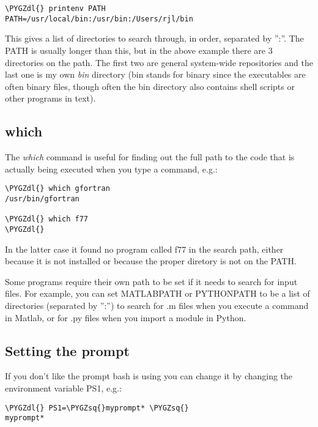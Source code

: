 \documentclass[letterpaper,10pt,english]{sphinxmanual}
\def\PYGZdl{\char`\$}
\def\PYGZsq{\char`\'}
\renewcommand\PYGZsq{\textquotesingle}
\begin{document}
\begin{Verbatim}[commandchars=\\\{\}]
\PYGZdl{} printenv PATH
PATH=/usr/local/bin:/usr/bin:/Users/rjl/bin
\end{Verbatim}

This gives a list of directories to search through, in order, separated by
'':''.   The PATH is usually longer than this, but in the above example there
are 3 directories on the path.  The first two are general system-wide
repositories and the last one is my own \emph{bin} directory (bin stands for
binary since the executables are often binary files, though often the bin
directory also contains shell scripts or other programs in text).


\subsection{which}
\label{unix:id6}\label{unix:which}
The \emph{which} command is useful for finding out the full path to the code that
is actually being executed when you type a command, e.g.:

\begin{Verbatim}[commandchars=\\\{\}]
\PYGZdl{} which gfortran
/usr/bin/gfortran

\PYGZdl{} which f77
\PYGZdl{}
\end{Verbatim}

In the latter case it found no program called f77 in the search path, either
because it is not installed or because the proper diretory is not on the
PATH.

Some programs require their own path to be set if it needs to search for
input files.  For example, you can set MATLABPATH or PYTHONPATH
to be a list of directories (separated by '':'') to search for .m files
when you execute a command in Matlab, or for .py files when you import
a module in Python.


\subsection{Setting the prompt}
\label{unix:prompt}\label{unix:setting-the-prompt}
If you don't like the prompt bash is using you can change it by changing the
environment variable PS1, e.g.:

\begin{Verbatim}[commandchars=\\\{\}]
\PYGZdl{} PS1=\PYGZsq{}myprompt* \PYGZsq{}
myprompt*
\end{Verbatim}
\end{document}
